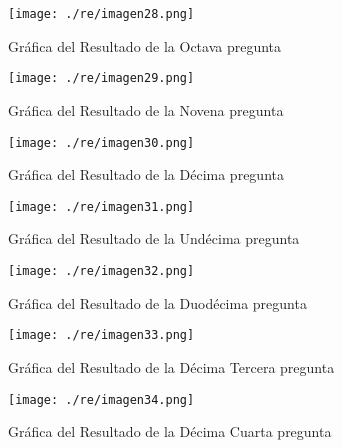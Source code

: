 \begin{figure}[H]
    \centering %
         \texttt{[image: ./re/imagen28.png]} 
    \caption{Gráfica del Resultado de la Octava pregunta \cite{}}
   \label{figure:Resultado 8} %
\end{figure}
\begin{figure}[H]
    \centering %
         \texttt{[image: ./re/imagen29.png]} 
    \caption{Gráfica del Resultado de la Novena pregunta \cite{}}
   \label{figure:Resultado 9} %
\end{figure}
\begin{figure}[H]
    \centering %
         \texttt{[image: ./re/imagen30.png]} 
    \caption{Gráfica del Resultado de la Décima pregunta \cite{}}
   \label{figure:Resulta,do 10} %
\end{figure}
\begin{figure}[H]
    \centering %
         \texttt{[image: ./re/imagen31.png]} 
    \caption{Gráfica del Resultado de la Undécima pregunta \cite{}}
   \label{figure:Result,ado 10} %
\end{figure}
\begin{figure}[H]
    \centering %
         \texttt{[image: ./re/imagen32.png]} 
    \caption{Gráfica del Resultado de la Duodécima pregunta \cite{}}
   \label{figure:Reskultado 10} %
\end{figure}
\begin{figure}[H]
    \centering %
         \texttt{[image: ./re/imagen33.png]} 
    \caption{Gráfica del Resultado de la Décima Tercera pregunta \cite{}}
   \label{figure:Resukltado 10} %
\end{figure}
\begin{figure}[H]
    \centering %
         \texttt{[image: ./re/imagen34.png]} 
    \caption{Gráfica del Resultado de la Décima Cuarta pregunta \cite{}}
   \label{figure:Resultado 10} %
\end{figure}


